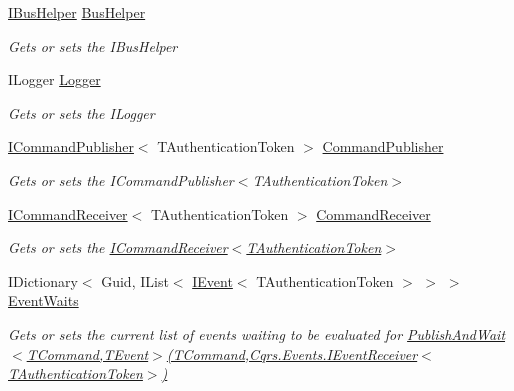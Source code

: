 \begin{DoxyCompactItemize}
\hyperlink{interfaceCqrs_1_1Bus_1_1IBusHelper}{I\+Bus\+Helper} \hyperlink{classCqrs_1_1Akka_1_1Commands_1_1AkkaCommandBus_abe5501970c0e39abb9a70670ab985fdc_abe5501970c0e39abb9a70670ab985fdc}{Bus\+Helper}
\begin{DoxyCompactList}\small\item\em Gets or sets the I\+Bus\+Helper \end{DoxyCompactList}\item 
I\+Logger \hyperlink{classCqrs_1_1Akka_1_1Commands_1_1AkkaCommandBus_a218e431067a4cadbdd711d74cbe8e53b_a218e431067a4cadbdd711d74cbe8e53b}{Logger}
\begin{DoxyCompactList}\small\item\em Gets or sets the I\+Logger \end{DoxyCompactList}\item 
\hyperlink{interfaceCqrs_1_1Commands_1_1ICommandPublisher}{I\+Command\+Publisher}$<$ T\+Authentication\+Token $>$ \hyperlink{classCqrs_1_1Akka_1_1Commands_1_1AkkaCommandBus_ad028b0520a1d98d1e7adcbecb781d261_ad028b0520a1d98d1e7adcbecb781d261}{Command\+Publisher}
\begin{DoxyCompactList}\small\item\em Gets or sets the I\+Command\+Publisher$<$\+T\+Authentication\+Token$>$ \end{DoxyCompactList}\item 
\hyperlink{interfaceCqrs_1_1Commands_1_1ICommandReceiver}{I\+Command\+Receiver}$<$ T\+Authentication\+Token $>$ \hyperlink{classCqrs_1_1Akka_1_1Commands_1_1AkkaCommandBus_ac65a93dadbbb006dd815c5c54c9ecc82_ac65a93dadbbb006dd815c5c54c9ecc82}{Command\+Receiver}
\begin{DoxyCompactList}\small\item\em Gets or sets the \hyperlink{interfaceCqrs_1_1Commands_1_1ICommandReceiver}{I\+Command\+Receiver$<$\+T\+Authentication\+Token$>$} \end{DoxyCompactList}\item 
I\+Dictionary$<$ Guid, I\+List$<$ \hyperlink{interfaceCqrs_1_1Events_1_1IEvent}{I\+Event}$<$ T\+Authentication\+Token $>$ $>$ $>$ \hyperlink{classCqrs_1_1Akka_1_1Commands_1_1AkkaCommandBus_af64744500f25a0b203684ef757aa7962_af64744500f25a0b203684ef757aa7962}{Event\+Waits}
\begin{DoxyCompactList}\small\item\em Gets or sets the current list of events waiting to be evaluated for \hyperlink{classCqrs_1_1Akka_1_1Commands_1_1AkkaCommandBus_a8e1291f0259ac80e393c02bb119159a5_a8e1291f0259ac80e393c02bb119159a5}{Publish\+And\+Wait$<$\+T\+Command,\+T\+Event$>$(\+T\+Command,\+Cqrs.\+Events.\+I\+Event\+Receiver$<$\+T\+Authentication\+Token$>$)} \end{DoxyCompactList}\end{DoxyCompactItemize}


